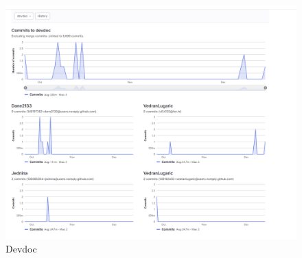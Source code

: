 		\begin{figure}
			\centering
			\includegraphics[width=15cm]{slike/devdoc.png}
			\caption{Devdoc}
			\label{fig:akt}
		\end{figure}
		
	